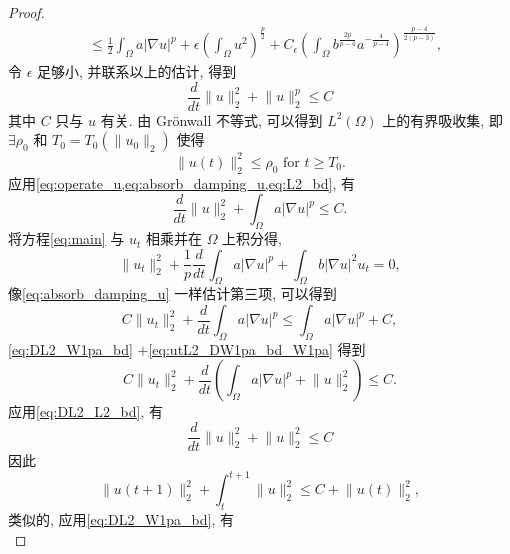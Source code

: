 \documentclass[oneside,longtitle]{LZUthesis}
\numberwithin{equation}{chapter}
\newcommand*\abs[1]{\lvert#1\rvert}
\newcommand*\norm[1]{\lVert#1\rVert}
\begin{document}
\begin{proof}
\begin{equation}
\begin{split}
			&\leq \frac{1}{2}\int_{\Omega}a\abs{\nabla u}^p
			+ \epsilon \left(\int_{\Omega}u^2\right)^{\frac{p}{2}}
			+ C_{\epsilon}\left(\int_{\Omega}b^{\frac{2p}{p-4}}a^{-\frac{4}{p-4}}\right)^{\frac{p-4}{2(p-3)}},
		\end{split}
	\end{equation}
	令 $\epsilon$ 足够小, 并联系以上的估计, 得到
	\begin{equation}\label{eq:DL2_L2_bd}
		\frac{d}{dt}\norm{u}_2^2 + \norm{u}_2^p \leq C
	\end{equation}
	其中 $C$ 只与 $u$ 有关. 由 Gr\"onwall 不等式, 可以得到 $L^2(\Omega)$ 上的有界吸收集,
	即 $\exists \rho_0$ 和
	$T_0 = T_0(\norm{u_0}_2)$ 使得
	\begin{equation}\label{eq:L2_bd}
		\norm{u(t)}_2^2 \leq \rho_0 \text{ for } t \geq T_0.
	\end{equation}
	应用\cref{eq:operate_u,eq:absorb_damping_u,eq:L2_bd}, 有
	\begin{equation}\label{eq:DL2_W1pa_bd}
		\frac{d}{dt}\norm{u}_2^2 + \int_{\Omega}a \abs{\nabla u}^p \leq C.
	\end{equation}
	将方程\eqref{eq:main} 与 $u_{t}$ 相乘并在 $\Omega$ 上积分得,
	\begin{equation}\label{eq:operate_ut}
		\norm{u_t}_2^2
		+ \frac{1}{p}\frac{d}{dt}\int_{\Omega}a \abs{\nabla u}^p
		+ \int_{\Omega}b \abs{\nabla u}^2 u_t
		= 0,
	\end{equation}
	像\cref{eq:absorb_damping_u} 一样估计第三项, 可以得到
	\begin{equation}\label{eq:utL2_DW1pa_bd_W1pa}
		C\norm{u_t}_2^2
		+ \frac{d}{dt}\int_{\Omega}a \abs{\nabla u}^p
		\leq \int_{\Omega}a \abs{\nabla u}^p
		+ C,
	\end{equation}
	\cref{eq:DL2_W1pa_bd} $+$\cref{eq:utL2_DW1pa_bd_W1pa} 得到
	\begin{equation}\label{eq:utL2_DW1pa_DL2}
		C\norm{u_t}_2^2
		+ \frac{d}{dt}\left(\int_{\Omega}a \abs{\nabla u}^p
		+ \norm{u}_2^2\right)
		\leq C.
	\end{equation}
	应用\cref{eq:DL2_L2_bd}, 有
	\begin{equation*}
		\frac{d}{dt}\norm{u}_2^2 + \norm{u}_2^2 \leq C
	\end{equation*}
	因此
	\begin{equation}\label{eq:int_DL2_L2_bd}
		\norm{u(t+1)}_2^2
		+ \int_t^{t+1}\norm{u}_2^2
		\leq C + \norm{u(t)}_2^2,
	\end{equation}
	类似的, 应用\cref{eq:DL2_W1pa_bd}, 有
	\begin{equation}\label{eq:int_DL2_W1pa_bd}

\end{equation}
\end{proof}
\end{document}
